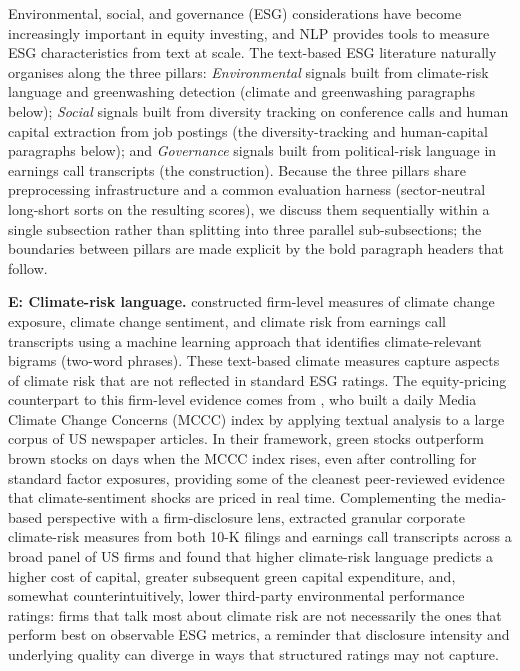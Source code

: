 Environmental, social, and governance (ESG) considerations have become increasingly important in equity investing, and NLP provides tools to measure ESG characteristics from text at scale. The text-based ESG literature naturally organises along the three pillars: \textit{Environmental} signals built from climate-risk language and greenwashing detection (climate and greenwashing paragraphs below); \textit{Social} signals built from diversity tracking on conference calls and human capital extraction from job postings (the diversity-tracking and human-capital paragraphs below); and \textit{Governance} signals built from political-risk language in earnings call transcripts (the \cite{hassan2019politicalrisk} construction). Because the three pillars share preprocessing infrastructure and a common evaluation harness (sector-neutral long-short sorts on the resulting scores), we discuss them sequentially within a single subsection rather than splitting into three parallel sub-subsections; the boundaries between pillars are made explicit by the bold paragraph headers that follow.

\textbf{E: Climate-risk language.} \cite{sautner2023firm} constructed firm-level measures of climate change exposure, climate change sentiment, and climate risk from earnings call transcripts using a machine learning approach that identifies climate-relevant bigrams (two-word phrases). These text-based climate measures capture aspects of climate risk that are not reflected in standard ESG ratings. The equity-pricing counterpart to this firm-level evidence comes from \cite{ardia2023climate}, who built a daily Media Climate Change Concerns (MCCC) index by applying textual analysis to a large corpus of US newspaper articles. In their framework, green stocks outperform brown stocks on days when the MCCC index rises, even after controlling for standard factor exposures, providing some of the cleanest peer-reviewed evidence that climate-sentiment shocks are priced in real time. Complementing the media-based perspective with a firm-disclosure lens, \cite{li2024corporate} extracted granular corporate climate-risk measures from both 10-K filings and earnings call transcripts across a broad panel of US firms and found that higher climate-risk language predicts a higher cost of capital, greater subsequent green capital expenditure, and, somewhat counterintuitively, lower third-party environmental performance ratings: firms that talk most about climate risk are not necessarily the ones that perform best on observable ESG metrics, a reminder that disclosure intensity and underlying quality can diverge in ways that structured ratings may not capture.

